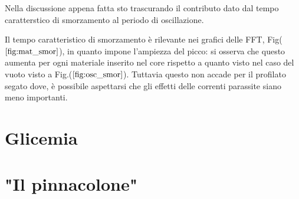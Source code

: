 \documentclass{article}
\begin{document}
        Nella discussione appena fatta sto trascurando il contributo dato dal 
        tempo caratterstico di smorzamento al periodo di oscillazione.
        
        Il tempo caratteristico di smorzamento è rilevante nei grafici 
        delle FFT, Fig($\ref{fig:mat_smor}$), in quanto impone l'ampiezza del picco:
        si osserva che questo aumenta per ogni materiale inserito nel core 
        rispetto a quanto visto nel caso  del vuoto visto a Fig.($\ref{fig:osc_smor}$).
        Tuttavia questo non accade per il profilato segato dove, è possibile  
        aspettarsi che gli effetti delle correnti parassite siano meno importanti.

        

\section{Glicemia}

\section{"Il pinnacolone"}
\end{document}
